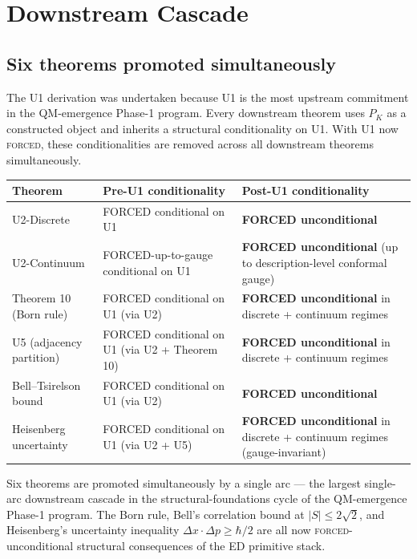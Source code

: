 \documentclass[11pt,a4paper]{article}
\begin{document}
\section{Downstream Cascade}\label{sec:cascade}

\subsection{Six theorems promoted simultaneously}

The U1 derivation was undertaken because U1 is the most upstream commitment in the QM-emergence Phase-1 program. Every downstream theorem uses $P_K$ as a constructed object and inherits a structural conditionality on U1. With U1 now \textsc{forced}, these conditionalities are removed across all downstream theorems simultaneously.

\begin{center}
\begin{tabular}{p{4.0cm}p{4.5cm}p{5.0cm}}
\hline
Theorem & Pre-U1 conditionality & Post-U1 conditionality \\
\hline
U2-Discrete~\cite{u2} & FORCED conditional on U1 & \textbf{FORCED unconditional} \\
U2-Continuum~\cite{u2} & FORCED-up-to-gauge conditional on U1 & \textbf{FORCED unconditional} (up to description-level conformal gauge) \\
Theorem 10 (Born rule)~\cite{borngleason} & FORCED conditional on U1 (via U2) & \textbf{FORCED unconditional} in discrete + continuum regimes \\
U5 (adjacency partition)~\cite{u5} & FORCED conditional on U1 (via U2 + Theorem 10) & \textbf{FORCED unconditional} in discrete + continuum regimes \\
Bell--Tsirelson bound~\cite{phase1} & FORCED conditional on U1 (via U2) & \textbf{FORCED unconditional} \\
Heisenberg uncertainty~\cite{phase1} & FORCED conditional on U1 (via U2 + U5) & \textbf{FORCED unconditional} in discrete + continuum regimes (gauge-invariant) \\
\hline
\end{tabular}
\end{center}

Six theorems are promoted simultaneously by a single arc --- the largest single-arc downstream cascade in the structural-foundations cycle of the QM-emergence Phase-1 program. The Born rule, Bell's correlation bound at $|S| \leq 2\sqrt{2}$, and Heisenberg's uncertainty inequality $\Delta x \cdot \Delta p \geq \hbar/2$ are all now \textsc{forced}-unconditional structural consequences of the ED primitive stack.
\end{document}

